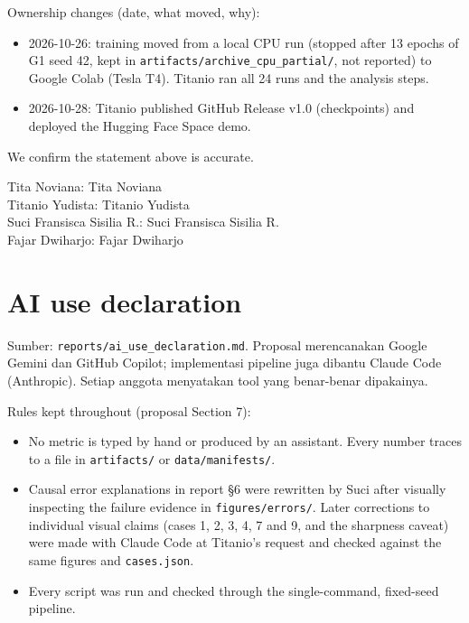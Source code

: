 \documentclass[10pt,a4paper]{article}
\providecommand{\tightlist}{\setlength{\itemsep}{2pt}\setlength{\parskip}{0pt}}
\begin{document}
Ownership changes (date, what moved, why):

\begin{itemize}
\tightlist
\item
  2026-10-26: training moved from a local CPU run (stopped after 13 epochs of G1 seed 42, kept in
  \texttt{artifacts/\allowbreak{}archive\_\allowbreak{}cpu\_\allowbreak{}partial/\allowbreak{}}, not reported) to Google Colab (Tesla T4). Titanio ran all 24 runs
  and the analysis steps.
\item
  2026-10-28: Titanio published GitHub Release v1.0 (checkpoints) and deployed the Hugging Face Space demo.
\end{itemize}

We confirm the statement above is accurate.

Tita Noviana: Tita Noviana\\
Titanio Yudista: Titanio Yudista\\
Suci Fransisca Sisilia R.: Suci Fransisca Sisilia R.\\
Fajar Dwiharjo: Fajar Dwiharjo

\section{AI use declaration}\label{ai-use-declaration}

Sumber: \texttt{reports/\allowbreak{}ai\_\allowbreak{}use\_\allowbreak{}declaration.md}. Proposal merencanakan Google Gemini dan GitHub Copilot;
implementasi pipeline juga dibantu Claude Code (Anthropic). Setiap anggota menyatakan tool yang
benar-benar dipakainya.

Rules kept throughout (proposal Section 7):

\begin{itemize}
\tightlist
\item
  No metric is typed by hand or produced by an assistant. Every number traces to a
  file in \texttt{artifacts/\allowbreak{}} or \texttt{data/\allowbreak{}manifests/\allowbreak{}}.
\item
  Causal error explanations in report §6 were rewritten by Suci after visually inspecting the
  failure evidence in \texttt{figures/\allowbreak{}errors/\allowbreak{}}. Later corrections to individual visual claims (cases 1, 2,
  3, 4, 7 and 9, and the sharpness caveat) were made with Claude Code at Titanio's request and
  checked against the same figures and \texttt{cases.json}.
\item
  Every script was run and checked through the single-command, fixed-seed pipeline.
\end{itemize}
\end{document}
